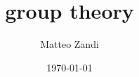 \documentclass[a4paper, 12pt, openany]{memoir}
\title{group theory}
\author{Matteo Zandi}
\date{\today}
\begin{document}
\frontmatter



\tableofcontents

\mainmatter




\backmatter

\listoftheorems

\clearpage
{}
\printbibliography
\end{document}
